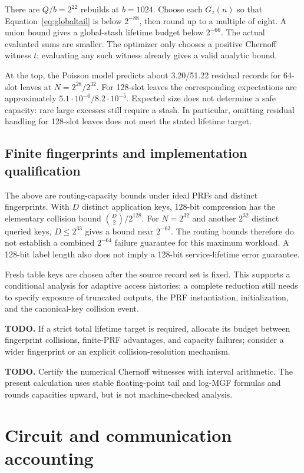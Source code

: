 \documentclass[11pt]{article}
\newcommand{\todo}[1]{\par\textbf{TODO.} #1\par}
\begin{document}
There are $Q/b=2^{22}$ rebuilds at $b=1024$. Choose each $G_z(n)$ so that
Equation~\eqref{eq:globaltail} is below $2^{-88}$, then round up to a
multiple of eight. A union bound gives a global-stash lifetime budget
below $2^{-66}$. The actual evaluated sums are smaller. The optimizer
only chooses a positive Chernoff witness $t$; evaluating any such witness
already gives a valid analytic bound.

At the top, the Poisson model predicts about 3.20/51.22 residual records
for 64-slot leaves at $N=2^{28}/2^{32}$. For 128-slot leaves the corresponding
expectations are approximately $5.1\cdot10^{-6}/8.2\cdot10^{-5}$. Expected
size does not determine a safe capacity: rare large excesses still require
a stash. In particular, omitting residual handling for 128-slot leaves
does not meet the stated lifetime target.

\subsection{Finite fingerprints and implementation qualification}
The above are routing-capacity bounds under ideal PRFs and distinct
fingerprints. With $D$ distinct application keys, 128-bit compression has
the elementary collision bound $\binom D2/2^{128}$. For $N=2^{32}$ and
another $2^{32}$ distinct queried keys, $D\le2^{33}$ gives a bound near
$2^{-63}$. The routing bounds therefore do not establish a combined
$2^{-64}$ failure guarantee for this maximum workload. A 128-bit label
length also does not imply a 128-bit service-lifetime error guarantee.

Fresh table keys are chosen after the source record set is fixed. This
supports a conditional analysis for adaptive access histories; a complete
reduction still needs to specify exposure of truncated outputs, the PRF
instantiation, initialization, and the canonical-key collision event.
\todo{If a strict total lifetime target is required, allocate its budget
between fingerprint collisions, finite-PRF advantages, and capacity failures;
consider a wider fingerprint or an explicit collision-resolution mechanism.}
\todo{Certify the numerical Chernoff witnesses with interval arithmetic.
The present calculation uses stable floating-point tail and log-MGF formulas
and rounds capacities upward, but is not machine-checked analysis.}

\section{Circuit and communication accounting}\label{sec:cost}
\end{document}
